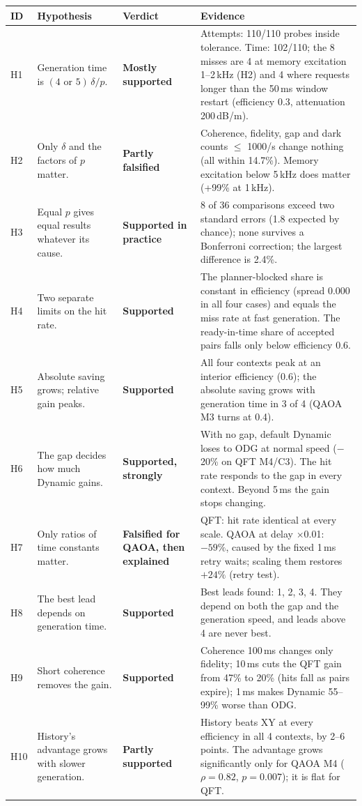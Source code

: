 \begin{tabular}{@{}lp{3.2cm}p{2.6cm}p{7.0cm}@{}}
\toprule
ID & Hypothesis & Verdict & Evidence \\
\midrule
H1 & Generation time is $(4\text{ or }5)\,\delta/p$. & \textbf{Mostly supported} & Attempts: 110/110 probes inside tolerance. Time: 102/110; the 8 misses are 4 at memory excitation 1--2\,kHz (H2) and 4 where requests longer than the 50\,ms window restart (efficiency 0.3, attenuation 200\,dB/m). \\[2pt]
H2 & Only $\delta$ and the factors of $p$ matter. & \textbf{Partly falsified} & Coherence, fidelity, gap and dark counts $\le$ 1000/s change nothing (all within 14.7\%). Memory excitation below 5\,kHz does matter (+99\% at 1\,kHz). \\[2pt]
H3 & Equal $p$ gives equal results whatever its cause. & \textbf{Supported in practice} & 8 of 36 comparisons exceed two standard errors (1.8 expected by chance); none survives a Bonferroni correction; the largest difference is 2.4\%. \\[2pt]
H4 & Two separate limits on the hit rate. & \textbf{Supported} & The planner-blocked share is constant in efficiency (spread 0.000 in all four cases) and equals the miss rate at fast generation. The ready-in-time share of accepted pairs falls only below efficiency 0.6. \\[2pt]
H5 & Absolute saving grows; relative gain peaks. & \textbf{Supported} & All four contexts peak at an interior efficiency (0.6); the absolute saving grows with generation time in 3 of 4 (QAOA M3 turns at 0.4). \\[2pt]
H6 & The gap decides how much Dynamic gains. & \textbf{Supported, strongly} & With no gap, default Dynamic loses to ODG at normal speed ($-$20\% on QFT M4/C3). The hit rate responds to the gap in every context. Beyond 5\,ms the gain stops changing. \\[2pt]
H7 & Only ratios of time constants matter. & \textbf{Falsified for QAOA, then explained} & QFT: hit rate identical at every scale. QAOA at delay $\times$0.01: $-59\%$, caused by the fixed 1\,ms retry waits; scaling them restores $+24\%$ (retry test). \\[2pt]
H8 & The best lead depends on generation time. & \textbf{Supported} & Best leads found: 1, 2, 3, 4. They depend on both the gap and the generation speed, and leads above 4 are never best. \\[2pt]
H9 & Short coherence removes the gain. & \textbf{Supported} & Coherence 100\,ms changes only fidelity; 10\,ms cuts the QFT gain from 47\% to 20\% (hits fall as pairs expire); 1\,ms makes Dynamic 55--99\% worse than ODG. \\[2pt]
H10 & History's advantage grows with slower generation. & \textbf{Partly supported} & History beats XY at every efficiency in all 4 contexts, by 2--6 points. The advantage grows significantly only for QAOA M4 ($\rho=0.82$, $p=0.007$); it is flat for QFT. \\[2pt]
\bottomrule
\end{tabular}
